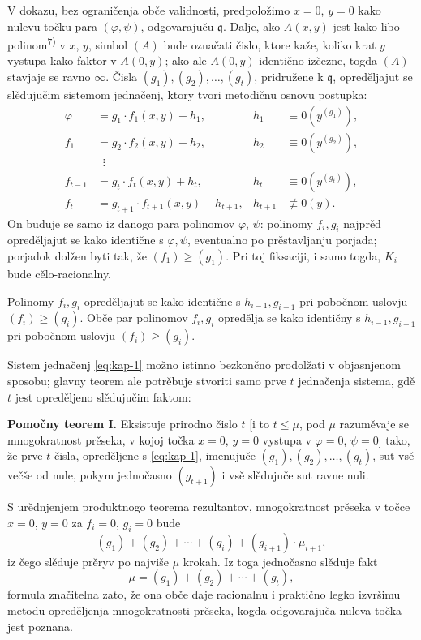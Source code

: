 \documentclass[11pt]{article}
\theoremstyle{plain}
\begin{document}
V dokazu, bez ograničenja obče validnosti, predpoložimo $x = 0$,
$y = 0$ kako nulevu točku para $(\varphi, \psi)$, odgovarajuču
$\mathfrak{q}$. Dalje, ako $A(x,y)$ jest kako-libo polinom\textsuperscript{7)}
v $x$, $y$, simbol $(A)$ bude označati čislo, ktore kaže, koliko
krat $y$ vystupa kako faktor v $A(0,y)$; ako ale $A(0,y)$
identično izčezne, togda $(A)$ stavjaje se ravno $\infty$. Čisla
$(g_{1}), (g_{2}), \ldots, (g_{t})$, pridružene k $\mathfrak{q}$,
opreděljajut se slědujučim sistemom jednačenj, ktory tvori
metodičnu osnovu postupka:
\begin{equation}\label{eq:kap-1}
\begin{aligned}
\varphi &= g_{1} \cdot f_{1}(x,y) + h_{1}, & h_{1} &\equiv 0(y^{(g_{1})}),\\
f_{1} &= g_{2} \cdot f_{2}(x,y) + h_{2}, & h_{2} &\equiv 0(y^{(g_{2})}),\\
&\;\;\vdots &&\\
f_{t-1} &= g_{t} \cdot f_{t}(x,y) + h_{t}, & h_{t} &\equiv 0(y^{(g_{t})}),\\
f_{t} &= g_{t+1} \cdot f_{t+1}(x,y) + h_{t+1}, & h_{t+1} &\not\equiv 0(y).
\end{aligned}
\end{equation}
On buduje se samo iz danogo para polinomov $\varphi$, $\psi$:
polinomy $f_{i}, g_{i}$ najprěd opreděljajut se kako identične s
$\varphi, \psi$, eventualno po prěstavljanju porjada; porjadok
dolžen byti tak, že $(f_{1}) \geq (g_{1})$. Pri toj fiksaciji, i
samo togda, $K_{i}$ bude cělo-racionalny.

Polinomy $f_{i}, g_{i}$ opreděljajut se kako identične s
$h_{i-1}, g_{i-1}$ pri pobočnom uslovju $(f_{i}) \geq (g_{i})$.
Obče par polinomov $f_{i}, g_{i}$ opredělja se kako identičny s
$h_{i-1}, g_{i-1}$ pri pobočnom uslovju $(f_{i}) \geq (g_{i})$.

Sistem jednačenj \eqref{eq:kap-1} možno istinno bezkončno
prodolžati v objasnjenom sposobu; glavny teorem ale potrěbuje
stvoriti samo prve $t$ jednačenja sistema, gdě $t$ jest opreděljeno
slědujučim faktom:

\smallskip
\textbf{Pomočny teorem I.} Eksistuje prirodno čislo $t$ [i to
$t \leq \mu$, pod $\mu$ razuměvaje se mnogokratnost prěseka, v kojoj
točka $x = 0$, $y = 0$ vystupa v $\varphi = 0$, $\psi = 0$] tako, že
prve $t$ čisla, opreděljene s \eqref{eq:kap-1}, imenujuče
$(g_{1}), (g_{2}), \ldots, (g_{t})$, sut vsě večše od nule, pokym
jednočasno $(g_{t+1})$ i vsě slědujuče sut ravne nuli.

S urědnjenjem produktnogo teorema rezultantov, mnogokratnost
prěseka v točce $x = 0$, $y = 0$ za $f_{i} = 0$, $g_{i} = 0$ bude
\[
(g_{1}) + (g_{2}) + \cdots + (g_{i}) + (g_{i+1}) \cdot \mu_{i+1},
\]
iz čego slěduje prěryv po najviše $\mu$ krokah. Iz toga jednočasno
slěduje fakt
\begin{equation}\label{eq:kap-2}
\mu = (g_{1}) + (g_{2}) + \cdots + (g_{t}),
\end{equation}
formula značitelna zato, že ona obče daje racionalnu i praktično
legko izvršimu metodu opreděljenja mnogokratnosti prěseka, kogda
odgovarajuča nuleva točka jest poznana.
\end{document}

